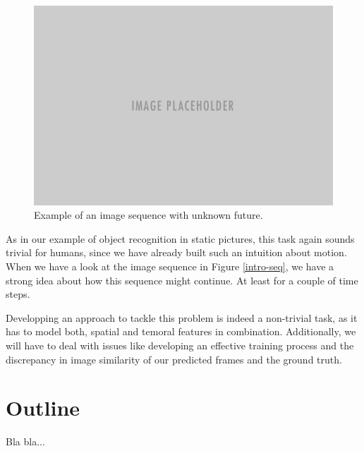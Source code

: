 \begin{figure}[htpb]
	\centering
	\includegraphics[scale=0.5]{figures/placeholder.png} 
	\caption{Example of an image sequence with unknown future.} \label{tab:intro-seq}
\end{figure}

As in our example of object recognition in static pictures, this task again sounds trivial for humans, since we have already built such an intuition about motion. When we have a look at the image sequence in Figure \ref{intro-seq}, we have a strong idea about how this sequence might continue. At least for a couple of time steps.

Developping an approach to tackle this problem is indeed a non-trivial task, as it has to model both, spatial and temoral features in combination. Additionally, we will have to deal with issues like developing an effective training process and the discrepancy in image similarity of our predicted frames and the ground truth.


\section{Outline}

Bla bla...


